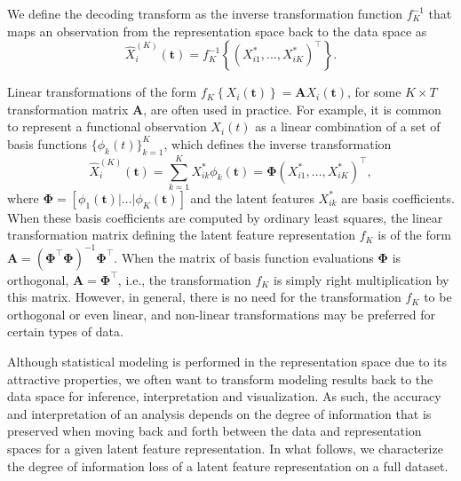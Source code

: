 


We define the decoding transform as the inverse transformation function $f^{-1}_K$ that maps an observation from the representation space back to the data space as
$$
\widehat{X}_i^{(K)} (\mathbf{t}) = f_{K}^{-1} \left\{ \left(X_{i1}^*, \dots,  X_{iK}^* \right)^\top \right\}.
$$

Linear transformations of the form $f_{K} \left\{X_i(\mathbf{t})\right\} = \mathbf{A} X_i(\mathbf{t})$, for some $K \times T$ transformation matrix $\mathbf{A}$, are often used in practice.
For example, it is common to represent a functional observation $X_i(t)$ as a linear combination of a set of basis functions $\{\phi_k(t)\}_{k=1}^K$, which defines the inverse transformation
$$
\widehat{X}_i^{(K)} (\mathbf{t}) = \sum_{k=1}^K X_{ik}^* \phi_k(\mathbf{t}) = \boldsymbol{\Phi} \left(X_{i1}^*, \dots,  X_{iK}^* \right)^\top,
$$
where $\boldsymbol{\Phi} = \left[\phi_1(\mathbf{t}) | \dots | \phi_K(\mathbf{t}) \right]$ and the latent features $X_{ik}^*$ are basis coefficients. 
When these basis coefficients are computed by ordinary least squares, the linear transformation matrix defining the latent feature representation $f_K$ is of the form $\mathbf{A} = \left( \boldsymbol{\Phi}^\top \boldsymbol{\Phi} \right)^{-1} \boldsymbol{\Phi}^\top$.
When the matrix of basis function evaluations $\boldsymbol{\Phi}$ is orthogonal, $\mathbf{A} = \boldsymbol{\Phi}^\top$, i.e., the transformation $f_K$ is simply right multiplication by this matrix.
However, in general, there is no need for the transformation $f_K$ to be orthogonal or even linear, and non-linear transformations may be preferred for certain types of data.

Although statistical modeling is performed in the representation space due to its attractive properties, we often want to transform modeling results back to the data space for inference, interpretation and visualization. 
As such, the accuracy and interpretation of an analysis depends on the degree of information that is preserved when moving back and forth between the data and representation spaces for a given latent feature representation.
In what follows, we characterize the degree of information loss of a latent feature representation on a full dataset.



